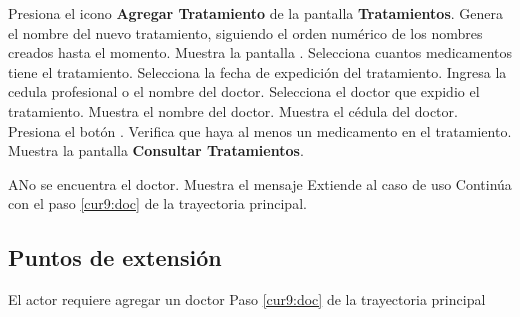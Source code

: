  \begin{UCtrayectoria}
 	
 	\UCpaso [\UCactor] Presiona el icono \textbf{Agregar Tratamiento} de la pantalla \textbf{Tratamientos}.
 	\UCpaso Genera el nombre del nuevo tratamiento, siguiendo el orden numérico de los nombres creados hasta el momento.
 	\UCpaso Muestra la pantalla .
 	\UCpaso [\UCactor] Selecciona cuantos medicamentos tiene el tratamiento.
 	\UCpaso [\UCactor] Selecciona la fecha de expedición del tratamiento.
 	\UCpaso [\UCactor] Ingresa la cedula profesional o el nombre del doctor.
 	\UCpaso [\UCactor] Selecciona el doctor que expidio el tratamiento.
 	\UCpaso Muestra el nombre del doctor.
 	\UCpaso Muestra el cédula del doctor.
 	\UCpaso [\UCactor] Presiona el botón . \label{cur9:doc}
 	\UCpaso Verifica que haya al menos un medicamento en el tratamiento.
 	\UCpaso Muestra la pantalla \textbf{Consultar Tratamientos}.
 	
 	
    
 \end{UCtrayectoria}

\begin{UCtrayectoriaA}{A}{No se encuentra el doctor.}
	\UCpaso Muestra el mensaje 
	\UCpaso Extiende al caso de uso  
	\UCpaso Continúa con el paso \ref{cur9:doc} de la trayectoria principal.
\end{UCtrayectoriaA} 
 



 
\subsection{Puntos de extensión}

\UCExtensionPoint
{El actor requiere agregar un doctor}
{ Paso \ref{cur9:doc} de la trayectoria principal}
{}



